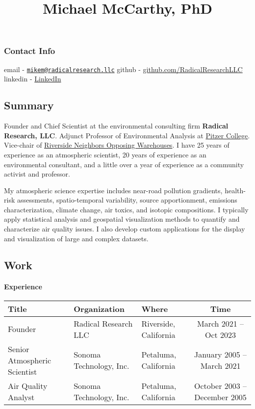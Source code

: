 \documentclass[
]{article}
\title{Michael McCarthy, PhD}
\author{}
\date{\vspace{-2.5em}}
\begin{document}
\maketitle

\hypertarget{contact-info}{%
\subsubsection{Contact Info}\label{contact-info}}

email -
\href{mailto:mikem@radicalresearch.llc}{\nolinkurl{mikem@radicalresearch.llc}}
github -
\href{https://github.com/RadicalResearchLLC}{github.com/RadicalResearchLLC}
linkedin -
\href{https://www.linkedin.com/in/mike-mccarthy-7966964/}{LinkedIn}

\hypertarget{summary}{%
\subsection{Summary}\label{summary}}

Founder and Chief Scientist at the environmental consulting firm
\textbf{Radical Research, LLC}. Adjunct Professor of Environmental
Analysis at \href{https://www.pitzer.edu/}{Pitzer College}. Vice-chair
of \href{https://sites.google.com/view/rivnow/}{Riverside Neighbors
Opposing Warehouses}. I have 25 years of experience as an atmospheric
scientist, 20 years of experience as an environmental consultant, and a
little over a year of experience as a community activist and professor.

My atmospheric science expertise includes near-road pollution gradients,
health-risk assessments, spatio-temporal variability, source
apportionment, emissions characterization, climate change, air toxics,
and isotopic compositions. I typically apply statistical analysis and
geospatial visualization methods to quantify and characterize air
quality issues. I also develop custom applications for the display and
visualization of large and complex datasets.

\hypertarget{work}{%
\subsection{Work}\label{work}}

\hypertarget{experience}{%
\paragraph{Experience}\label{experience}}

\begin{longtable}{lllc}
\toprule
Title & Organization & Where & Time \\ 
\midrule
Founder & Radical Research LLC & Riverside, California & March 2021 -- Oct 2023 \\ 
Senior Atmospheric Scientist & Sonoma Technology, Inc. & Petaluma, California & January 2005 -- March 2021 \\ 
Air Quality Analyst & Sonoma Technology, Inc. & Petaluma, California & October 2003 -- December 2005 \\ 
\bottomrule
\end{longtable}
\end{document}
